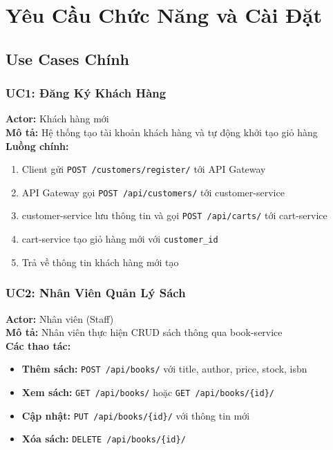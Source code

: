 \documentclass[12pt,a4paper]{article}
\begin{document}
\section{Yêu Cầu Chức Năng và Cài Đặt}

\subsection{Use Cases Chính}

\subsubsection{UC1: Đăng Ký Khách Hàng}

\begin{tcolorbox}[servicebox, title={Use Case: Đăng Ký Khách Hàng}]
  \textbf{Actor:} Khách hàng mới \\
  \textbf{Mô tả:} Hệ thống tạo tài khoản khách hàng và tự động khởi tạo giỏ hàng \\[0.3cm]
  \textbf{Luồng chính:}
  \begin{enumerate}
    \item Client gửi \texttt{POST /customers/register/} tới API Gateway
    \item API Gateway gọi \texttt{POST /api/customers/} tới customer-service
    \item customer-service lưu thông tin và gọi \texttt{POST /api/carts/} tới cart-service
    \item cart-service tạo giỏ hàng mới với \texttt{customer\_id}
    \item Trả về thông tin khách hàng mới tạo
  \end{enumerate}
\end{tcolorbox}

\subsubsection{UC2: Nhân Viên Quản Lý Sách}

\begin{tcolorbox}[servicebox, title={Use Case: Quản Lý Sách (Staff)}]
  \textbf{Actor:} Nhân viên (Staff) \\
  \textbf{Mô tả:} Nhân viên thực hiện CRUD sách thông qua book-service \\[0.3cm]
  \textbf{Các thao tác:}
  \begin{itemize}
    \item \textbf{Thêm sách:} \texttt{POST /api/books/} với title, author, price, stock, isbn
    \item \textbf{Xem sách:} \texttt{GET /api/books/} hoặc \texttt{GET /api/books/\{id\}/}
    \item \textbf{Cập nhật:} \texttt{PUT /api/books/\{id\}/} với thông tin mới
    \item \textbf{Xóa sách:} \texttt{DELETE /api/books/\{id\}/}
  \end{itemize}
\end{tcolorbox}
\end{document}
